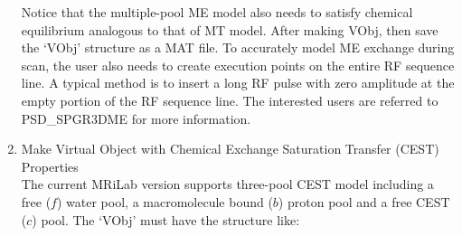 \documentclass{book}%
\begin{document}
\begin{enumerate}
Notice that the multiple-pool ME model also needs to satisfy chemical equilibrium analogous to that of MT model. After making VObj, then save the `VObj' structure as a MAT file. To accurately model ME exchange during scan, the user also needs to create execution points on the entire RF sequence line. A typical method is to insert a long RF pulse with zero amplitude at the empty portion of the RF sequence line. The interested users are referred to PSD\_SPGR3DME for more information.


\item Make Virtual Object with Chemical Exchange Saturation Transfer (CEST) Properties\\

The current MRiLab version supports three-pool CEST model including a free ($f$) water pool, a macromolecule bound ($b$) proton pool and a free CEST ($c$) pool. The `VObj' must have the structure like:


\end{enumerate}
\end{document}
